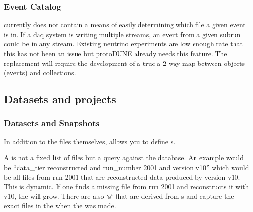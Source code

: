 \subsubsection{Event Catalog}
 currently does not contain a means of easily determining which file a given event is in.  If a daq system is writing multiple streams, an event from a given subrun could be in any stream.   Existing neutrino experiments are low enough rate that this has not been an issue but protoDUNE already needs this feature.
The  replacement will require the development of a true a 2-way map between objects (events) and collections. 

 


\subsection{Datasets and projects}

\subsubsection{Datasets and Snapshots}

In addition to the files themselves,  allows you to define s.

A   is not a fixed list of files but a query against the  database. An example would be “data\_tier reconstructed and run\_number 2001 and version v10” which would be all files from run 2001 that are reconstructed data produced by version v10. This  is dynamic. If one finds a missing file from run 2001 and reconstructs it with v10, the  will grow. There are also  `s` that are derived from s and capture the exact files in the  when the  was made.




